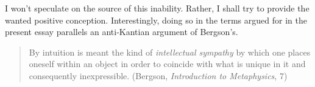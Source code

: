I won't speculate on the source of this inability. Rather, I shall try to provide the wanted positive conception. Interestingly, doing so in the terms argued for in the present essay parallels an anti-Kantian argument of Bergson's.


\begin{quote}
	By intuition is meant the kind of \emph{intellectual sympathy} by which one places oneself within an object in order to coincide with what is unique in it and consequently inexpressible. (Bergson, \emph{Introduction to Metaphysics}, 7)
\end{quote}



